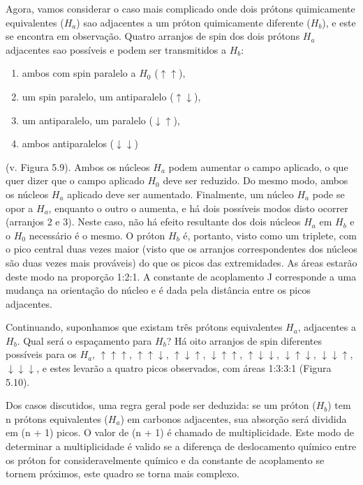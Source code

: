 Agora, vamos considerar o caso mais complicado onde dois prótons quimicamente equivalentes ($H_a$) sao adjacentes a um próton quimicamente diferente ($H_b$), e este se encontra em observação. Quatro arranjos de spin dos dois prótons $H_a$ adjacentes sao possíveis e podem ser transmitidos a $H_b$:

\begin{enumerate}
    \item ambos com spin paralelo a $H_0$ ($\uparrow\uparrow$),
    \item um spin paralelo, um antiparalelo ($\uparrow\downarrow$),
    \item um antiparalelo, um paralelo ($\downarrow\uparrow$),
    \item ambos antiparalelos ($\downarrow\downarrow$)
\end{enumerate}

\noindent (v. Figura 5.9). Ambos os núcleos $H_a$ podem aumentar o campo aplicado, o que quer dizer que o campo aplicado $H_0$ deve ser reduzido. Do mesmo modo, ambos os núcleos $H_a$ aplicado deve ser aumentado. Finalmente, um núcleo $H_a$ pode se opor a $H_a$, enquanto o outro o aumenta, e há dois possíveis modos disto ocorrer (arranjos 2 e 3). Neste caso, não há efeito resultante dos dois núcleos $H_a$ em $H_b$ e o $H_0$ necessário é o mesmo. O próton $H_b$ é, portanto, visto como um triplete, com o pico central duas vezes maior (visto que os arranjos correspondentes dos núcleos são duas vezes mais prováveis) do que os picos das extremidades. As áreas estarão deste modo na proporção 1:2:1. A constante de acoplamento J corresponde a uma mudança na orientação do núcleo e é dada pela distância entre os picos adjacentes.

Continuando, suponhamos que existam três prótons equivalentes $H_a$, adjacentes a $H_b$. Qual será o espaçamento para $H_b$? Há oito arranjos de spin diferentes possíveis para os $H_a$, $\uparrow\uparrow\uparrow$, $\uparrow\uparrow\downarrow$, $\uparrow\downarrow\uparrow$, $\downarrow\uparrow\uparrow$, $\uparrow\downarrow\downarrow$, $\downarrow\uparrow\downarrow$, $\downarrow\downarrow\uparrow$, $\downarrow\downarrow\downarrow$, e estes levarão a quatro picos observados, com áreas 1:3:3:1 (Figura 5.10).

Dos casos discutidos, uma regra geral pode ser deduzida: se um próton ($H_b$) tem n prótons equivalentes ($H_a$) em carbonos adjacentes, sua absorção será dividida em (n + 1) picos. O valor de (n + 1) é chamado de multiplicidade. Este modo de determinar a multiplicidade é valido se a diferença de deslocamento químico entre os próton for consideravelmente químico e da constante de acoplamento se tornem próximos, este quadro se torna mais complexo.

